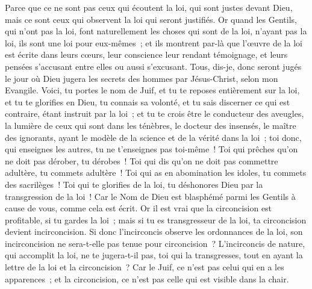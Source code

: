 \begin{multicols}{2}
Parce que ce ne sont pas ceux qui écoutent la loi, qui sont justes devant Dieu, mais ce sont ceux qui observent la loi qui seront justifiés.
Or quand les Gentils, qui n'ont pas la loi, font naturellement les choses qui sont de la loi, n'ayant pas la loi, ils sont une loi pour eux-mêmes~;
et ils montrent par-là que l'œuvre de la loi est écrite dans leurs cœurs, leur conscience leur rendant témoignage, et leurs pensées s'accusant entre elles ou aussi s'excusant.
Tous, dis-je, donc seront jugés le jour où Dieu jugera les secrets des hommes par Jésus-Christ, selon mon Evangile.
Voici, tu portes le nom de Juif, et tu te reposes entièrement sur la loi, et tu te glorifies en Dieu,
tu connais sa volonté, et tu sais discerner ce qui est contraire, étant instruit par la loi~; 
et tu te crois être le conducteur des aveugles, la lumière de ceux qui sont dans les ténèbres,
le docteur des insensés, le maître des ignorants, ayant le modèle de la science et de la vérité dans la loi~;
toi donc, qui enseignes les autres, tu ne t'enseignes pas toi-même~! Toi qui prêches qu'on ne doit pas dérober, tu dérobes~!
Toi qui dis qu'on ne doit pas commettre adultère, tu commets adultère~! Toi qui as en abomination les idoles, tu commets des sacrilèges~!
Toi qui te glorifies de la loi, tu déshonores Dieu par la transgression de la loi~!
Car le Nom de Dieu est blasphémé parmi les Gentils à cause de vous, comme cela est écrit.
Or il est vrai que la circoncision est profitable, si tu gardes la loi~; mais si tu es transgresseur de la loi, ta circoncision devient incirconcision.
Si donc l'incirconcis observe les ordonnances de la loi, son incirconcision ne sera-t-elle pas tenue pour circoncision~?
L'incirconcis de nature, qui accomplit la loi, ne te jugera-t-il pas, toi qui la transgresses, tout en ayant la lettre de la loi et la circoncision~?
Car le Juif, ce n'est pas celui qui en a les apparences~; et la circoncision, ce n'est pas celle qui est visible dans la chair.

\end{multicols}

